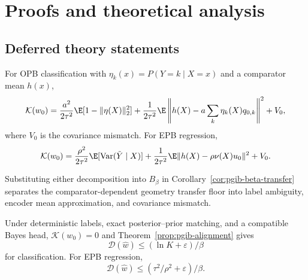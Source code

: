 \section{Proofs and theoretical analysis}
\label{app:theory}

\subsection{Deferred theory statements}
\label{app:deferred-theory}

\begin{proposition}
\label{prop:pgib-ambiguity-decomposition}
For OPB classification with $\eta_k(x)=P(Y=k\mid X=x)$ and a comparator mean $h(x)$,
\begin{equation}
\mathcal K(w_0)=\frac{a^2}{2\tau^2}\E[1-\|\eta(X)\|_2^2]
+\frac1{2\tau^2}\E\left\|h(X)-a\sum_k\eta_k(X)q_{0,k}\right\|^2+V_0,
\label{eq:opb-ambiguity-decomposition}
\end{equation}
where $V_0$ is the covariance mismatch. For EPB regression,
\begin{equation}
\mathcal K(w_0)=\frac{\rho^2}{2\tau^2}\E[\operatorname{Var}(\tilde Y\mid X)]
+\frac1{2\tau^2}\E\|h(X)-\rho\nu(X)u_0\|^2+V_0.
\label{eq:epb-ambiguity-decomposition}
\end{equation}
\end{proposition}

Substituting either decomposition into $B_\beta$ in
Corollary~\ref{cor:pgib-beta-transfer} separates the comparator-dependent geometry
transfer floor into label ambiguity, encoder mean approximation, and covariance
mismatch.

\begin{corollary}
\label{cor:pgib-exact-alignment}
Under deterministic labels, exact posterior--prior matching, and a compatible Bayes
head, $\mathcal K(w_0)=0$ and Theorem~\ref{prop:pgib-alignment} gives
\begin{equation}
\mathcal D(\widehat w)\le(\ln K+\varepsilon)/\beta
\label{eq:pgib-alignment}
\end{equation}
for classification. For EPB regression,
\begin{equation}
\mathcal D(\widehat w)\le(\tau^2/\rho^2+\varepsilon)/\beta.
\label{eq:pgib-alignment-regression}
\end{equation}
\end{corollary}

